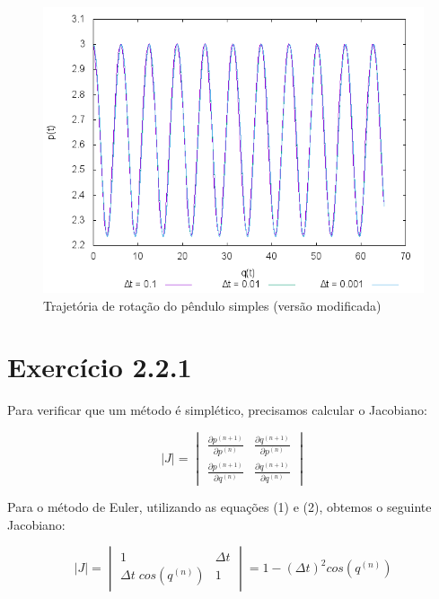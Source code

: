 \documentclass[a4paper,10pt]{article}
\begin{document}
    \begin{figure}[H]
      \centering
      \includegraphics[scale=0.6]{../Programa2/Figura12.png}
      \caption{Trajetória de rotação do pêndulo simples (versão modificada)}
    \end{figure}

\section*{Exercício 2.2.1}

 Para verificar que um método é simplético, precisamos calcular o Jacobiano:

 \begin{equation}
   |J| = \begin{vmatrix}
            \frac{\partial p^{(n+1)}}{\partial p^{(n)}} & \frac{\partial q^{(n+1)}}{\partial p^{(n)}} \\
            \frac{\partial p^{(n+1)}}{\partial q^{(n)}} & \frac{\partial q^{(n+1)}}{\partial q^{(n)}}
         \end{vmatrix}
 \end{equation}

 Para o método de Euler, utilizando as equações (1) e (2), obtemos o seguinte Jacobiano:

 \begin{equation}
   |J| = \begin{vmatrix}
          1 & \Delta t \\
          \Delta t \; cos(q^{(n)}) & 1
         \end{vmatrix}
         = 1 - (\Delta t)^2 cos(q^{(n)})
 \end{equation}
\end{document}
